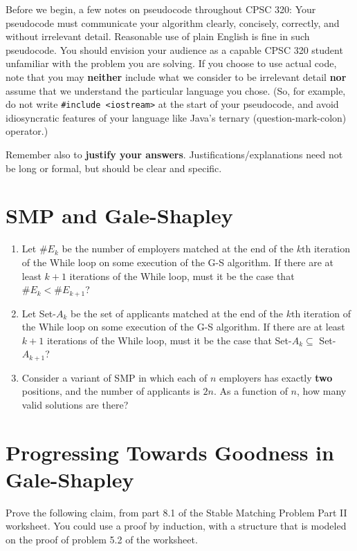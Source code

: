 \documentclass[11pt]{article}
\begin{document}
Before  we  begin, a  few  notes  on  pseudocode  throughout CPSC  320:  Your
pseudocode must  communicate your
algorithm  clearly,  concisely,  correctly, and  without  irrelevant  detail.
Reasonable  use of  plain  English is  fine in  such  pseudocode. You  should
envision your  audience as  a capable  CPSC 320  student unfamiliar  with the
problem you are solving. If you choose  to use actual code, note that you may
\textbf{neither} include what we consider to  be irrelevant detail \textbf{nor} assume that
we understand  the particular language  you chose.  (So, for example,  do not
write  \texttt{\#include <iostream>}  at  the  start of  your  pseudocode, and  avoid
idiosyncratic    features   of    your   language    like   Java's    ternary
(question-mark-colon) operator.)

Remember also to \textbf{justify your answers}. Justifications/explanations need not
be long or formal, but should be clear and specific.

\clearpage
\section{SMP and Gale-Shapley}
\label{sec-1}

\begin{enumerate}
\item Let $\#E_k$ be the number of employers matched at the end of the
$k\mbox{th}$ iteration of the While loop on some execution of the
G-S algorithm. If there are at least $k+1$ iterations of the
While loop, must it be the case that $\#E_k < \#E_{k+1}$?

\item Let Set-$A_k$ be the set of applicants matched at
the end of the $k\mbox{th}$ iteration of the While loop on some
execution of the G-S
algorithm. If there are at least $k+1$ iterations of the
While loop, must it be the case that 
Set-$A_k \subseteq$ Set-$A_{k+1}$?

\item Consider a variant of SMP in which each of $n$ employers has exactly
\textbf{two} positions, and the number of applicants is $2n$.  As a function
of $n$, how many valid solutions are there?
\end{enumerate}

\section{Progressing Towards Goodness in Gale-Shapley}
\label{sec-2}
Prove the following claim, from part 8.1 of the Stable Matching
Problem Part II worksheet. You could use a proof by induction, with a
structure that is modeled on the proof of problem 5.2 of the
worksheet.
\end{document}
